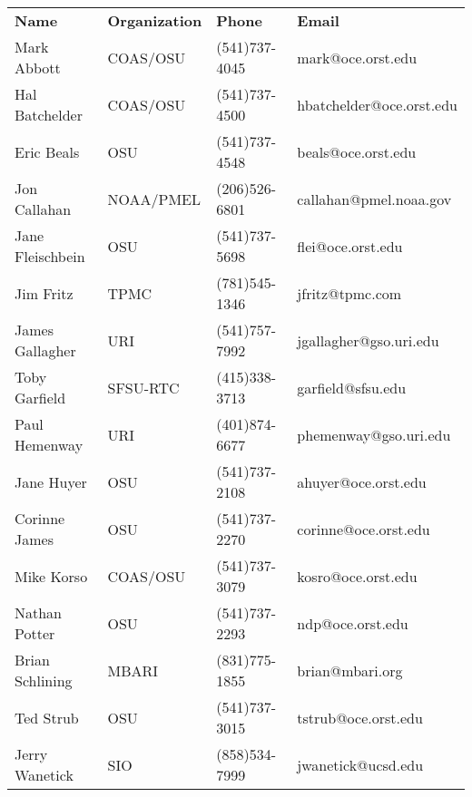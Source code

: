 \begin{center}
  \begin{tabular}[t]{llll} \\
\textbf{Name} & \textbf{Organization} & \textbf{Phone} & \textbf{Email} \\
Mark Abbott &             COAS/OSU               & (541)737-4045         &  mark@oce.orst.edu \\
Hal Batchelder &          COAS/OSU               & (541)737-4500         &  hbatchelder@oce.orst.edu \\
Eric Beals &              OSU                    & (541)737-4548         &  beals@oce.orst.edu \\
Jon Callahan &            NOAA/PMEL              & (206)526-6801         &  callahan@pmel.noaa.gov \\
Jane Fleischbein &                OSU                    & (541)737-5698         &  flei@oce.orst.edu \\
Jim Fritz &                       TPMC                   & (781)545-1346         &  jfritz@tpmc.com \\
James Gallagher &         URI                    & (541)757-7992         &  jgallagher@gso.uri.edu \\
Toby Garfield &           SFSU-RTC               & (415)338-3713         &  garfield@sfsu.edu \\
Paul Hemenway &           URI                    & (401)874-6677         &  phemenway@gso.uri.edu \\
Jane Huyer &              OSU                    & (541)737-2108         &  ahuyer@oce.orst.edu \\
Corinne James &           OSU                    & (541)737-2270         &  corinne@oce.orst.edu \\
Mike Korso &              COAS/OSU               & (541)737-3079         &  kosro@oce.orst.edu \\
Nathan Potter &           OSU                    & (541)737-2293         &  ndp@oce.orst.edu \\
Brian Schlining &         MBARI                  & (831)775-1855         &  brian@mbari.org \\
Ted Strub &               OSU                    & (541)737-3015         &  tstrub@oce.orst.edu \\
Jerry Wanetick &          SIO                    & (858)534-7999         &  jwanetick@ucsd.edu \\
  \end{tabular}
\end{center}


